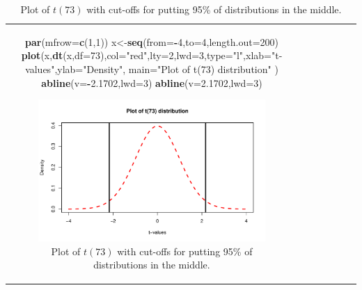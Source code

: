 \documentclass[]{book}
\newenvironment{Shaded}{\begin{snugshade}}{\end{snugshade}}
\newcommand{\KeywordTok}[1]{\textcolor[rgb]{0.13,0.29,0.53}{\textbf{#1}}}
\newcommand{\DataTypeTok}[1]{\textcolor[rgb]{0.13,0.29,0.53}{#1}}
\newcommand{\DecValTok}[1]{\textcolor[rgb]{0.00,0.00,0.81}{#1}}
\newcommand{\FloatTok}[1]{\textcolor[rgb]{0.00,0.00,0.81}{#1}}
\newcommand{\StringTok}[1]{\textcolor[rgb]{0.31,0.60,0.02}{#1}}
\newcommand{\OperatorTok}[1]{\textcolor[rgb]{0.81,0.36,0.00}{\textbf{#1}}}
\newcommand{\NormalTok}[1]{#1}
\theoremstyle{definition}
\theoremstyle{definition}
\theoremstyle{remark}
\begin{document}
\begin{longtable}[]{@{}ccccccc@{}}
\begin{minipage}[b]{0.10\columnwidth}
\begin{Shaded}
\begin{Highlighting}[]
\begin{Shaded}
\begin{Highlighting}[]
\begin{Shaded}
\begin{Highlighting}[]
\KeywordTok{par}\NormalTok{(}\DataTypeTok{mfrow=}\KeywordTok{c}\NormalTok{(}\DecValTok{1}\NormalTok{,}\DecValTok{1}\NormalTok{))}
\NormalTok{x<-}\KeywordTok{seq}\NormalTok{(}\DataTypeTok{from=}\OperatorTok{-}\DecValTok{4}\NormalTok{,}\DataTypeTok{to=}\DecValTok{4}\NormalTok{,}\DataTypeTok{length.out=}\DecValTok{200}\NormalTok{)}
\KeywordTok{plot}\NormalTok{(x,}\KeywordTok{dt}\NormalTok{(x,}\DataTypeTok{df=}\DecValTok{73}\NormalTok{),}\DataTypeTok{col=}\StringTok{"red"}\NormalTok{,}\DataTypeTok{lty=}\DecValTok{2}\NormalTok{,}\DataTypeTok{lwd=}\DecValTok{3}\NormalTok{,}\DataTypeTok{type=}\StringTok{"l"}\NormalTok{,}\DataTypeTok{xlab=}\StringTok{"t-values"}\NormalTok{,}\DataTypeTok{ylab=}\StringTok{"Density"}\NormalTok{,}
     \DataTypeTok{main=}\StringTok{"Plot of t(73) distribution"}\NormalTok{ )}
\KeywordTok{abline}\NormalTok{(}\DataTypeTok{v=}\OperatorTok{-}\FloatTok{2.1702}\NormalTok{,}\DataTypeTok{lwd=}\DecValTok{3}\NormalTok{)}
\KeywordTok{abline}\NormalTok{(}\DataTypeTok{v=}\FloatTok{2.1702}\NormalTok{,}\DataTypeTok{lwd=}\DecValTok{3}\NormalTok{)}
\end{Highlighting}
\end{Shaded}

\begin{figure}
\centering
\includegraphics{02-reintroductionToStatistics_files/figure-latex/Figure2-20-1.pdf}
\caption{\label{fig:Figure2-20}Plot of \(t(73)\) with cut-offs for putting 95\% of
distributions in the middle.}
\end{figure}


\end{Highlighting}
\end{Shaded}
\end{Highlighting}
\end{Shaded}
\end{minipage}
\end{longtable}
\end{document}
